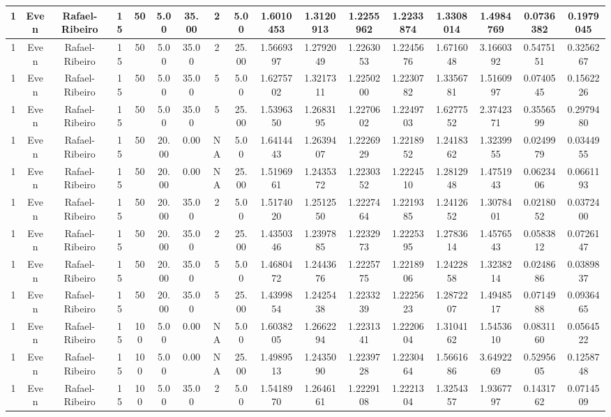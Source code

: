 \begin{longtable}{ | c | c | c | c | c | c | c | c | c | c | c | c | c | c | c | c | c | }
	\hline
	1	&	Even	&	Rafael-Ribeiro	&	15	&	50	&	5.00	&	35.00	&	2	&	5.00	&	1.6010453	&	1.3120913	&	1.2255962	&	1.2233874	&	1.3308014	&	1.4984769	&	0.0736382	&	0.1979045 \\
	\hline
	1	&	Even	&	Rafael-Ribeiro	&	15	&	50	&	5.00	&	35.00	&	2	&	25.00	&	1.5669397	&	1.2792049	&	1.2263053	&	1.2245676	&	1.6716048	&	3.1660392	&	0.5475151	&	0.3256267 \\
	\hline
	1	&	Even	&	Rafael-Ribeiro	&	15	&	50	&	5.00	&	35.00	&	5	&	5.00	&	1.6275702	&	1.3217311	&	1.2250200	&	1.2230782	&	1.3356781	&	1.5160997	&	0.0740545	&	0.1562226 \\
	\hline
	1	&	Even	&	Rafael-Ribeiro	&	15	&	50	&	5.00	&	35.00	&	5	&	25.00	&	1.5396350	&	1.2683195	&	1.2270602	&	1.2249703	&	1.6277552	&	2.3742371	&	0.3556599	&	0.2979480 \\
	\hline
	1	&	Even	&	Rafael-Ribeiro	&	15	&	50	&	20.00	&	0.00	&	NA	&	5.00	&	1.6414443	&	1.2639407	&	1.2226929	&	1.2218952	&	1.2418362	&	1.3239955	&	0.0249979	&	0.0344955 \\
	\hline
	1	&	Even	&	Rafael-Ribeiro	&	15	&	50	&	20.00	&	0.00	&	NA	&	25.00	&	1.5196961	&	1.2435372	&	1.2230352	&	1.2224510	&	1.2812948	&	1.4751943	&	0.0623406	&	0.0661193 \\
	\hline
	1	&	Even	&	Rafael-Ribeiro	&	15	&	50	&	20.00	&	35.00	&	2	&	5.00	&	1.5174020	&	1.2512550	&	1.2227464	&	1.2219385	&	1.2412652	&	1.3078401	&	0.0218052	&	0.0372400 \\
	\hline
	1	&	Even	&	Rafael-Ribeiro	&	15	&	50	&	20.00	&	35.00	&	2	&	25.00	&	1.4350346	&	1.2397885	&	1.2232973	&	1.2225395	&	1.2783614	&	1.4576543	&	0.0583812	&	0.0726147 \\
	\hline
	1	&	Even	&	Rafael-Ribeiro	&	15	&	50	&	20.00	&	35.00	&	5	&	5.00	&	1.4680472	&	1.2443676	&	1.2225775	&	1.2218906	&	1.2422858	&	1.3238214	&	0.0248686	&	0.0389837 \\
	\hline
	1	&	Even	&	Rafael-Ribeiro	&	15	&	50	&	20.00	&	35.00	&	5	&	25.00	&	1.4399854	&	1.2425438	&	1.2233239	&	1.2225623	&	1.2872207	&	1.4948517	&	0.0714988	&	0.0936465 \\
	\hline
	1	&	Even	&	Rafael-Ribeiro	&	15	&	100	&	5.00	&	0.00	&	NA	&	5.00	&	1.6038205	&	1.2662294	&	1.2231341	&	1.2220604	&	1.3104162	&	1.5453610	&	0.0831160	&	0.0564522 \\
	\hline
	1	&	Even	&	Rafael-Ribeiro	&	15	&	100	&	5.00	&	0.00	&	NA	&	25.00	&	1.4989513	&	1.2435090	&	1.2239728	&	1.2230464	&	1.5661686	&	3.6492269	&	0.5295605	&	0.1258748 \\
	\hline
	1	&	Even	&	Rafael-Ribeiro	&	15	&	100	&	5.00	&	35.00	&	2	&	5.00	&	1.5418970	&	1.2646161	&	1.2229108	&	1.2221304	&	1.3254357	&	1.9367797	&	0.1431762	&	0.0714509 \\

\end{longtable}
